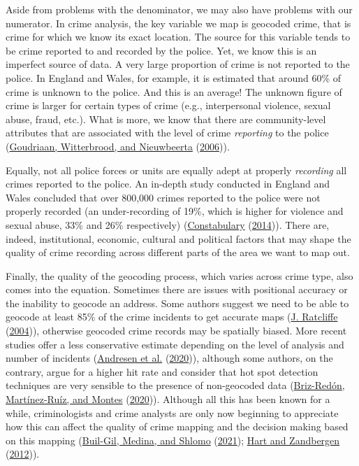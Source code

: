 \documentclass[
]{book}
\begin{document}
Aside from problems with the denominator, we may also have problems with our numerator. In crime analysis, the key variable we map is geocoded crime, that is crime for which we know its exact location. The source for this variable tends to be crime reported to and recorded by the police. Yet, we know this is an imperfect source of data. A very large proportion of crime is not reported to the police. In England and Wales, for example, it is estimated that around 60\% of crime is unknown to the police. And this is an average! The unknown figure of crime is larger for certain types of crime (e.g., interpersonal violence, sexual abuse, fraud, etc.). What is more, we know that there are community-level attributes that are associated with the level of crime \emph{reporting} to the police (\protect\hyperlink{ref-Goudriaan_2006}{Goudriaan, Witterbrood, and Nieuwbeerta} (\protect\hyperlink{ref-Goudriaan_2006}{2006})).

Equally, not all police forces or units are equally adept at properly \emph{recording} all crimes reported to the police. An in-depth study conducted in England and Wales concluded that over 800,000 crimes reported to the police were not properly recorded (an under-recording of 19\%, which is higher for violence and sexual abuse, 33\% and 26\% respectively) (\protect\hyperlink{ref-HMIC_2014}{Constabulary} (\protect\hyperlink{ref-HMIC_2014}{2014})). There are, indeed, institutional, economic, cultural and political factors that may shape the quality of crime recording across different parts of the area we want to map out.

Finally, the quality of the geocoding process, which varies across crime type, also comes into the equation. Sometimes there are issues with positional accuracy or the inability to geocode an address. Some authors suggest we need to be able to geocode at least 85\% of the crime incidents to get accurate maps (\protect\hyperlink{ref-Ratcliffe_2004}{J. Ratcliffe} (\protect\hyperlink{ref-Ratcliffe_2004}{2004})), otherwise geocoded crime records may be spatially biased. More recent studies offer a less conservative estimate depending on the level of analysis and number of incidents (\protect\hyperlink{ref-Andresen_2020}{Andresen et al.} (\protect\hyperlink{ref-Andresen_2020}{2020})), although some authors, on the contrary, argue for a higher hit rate and consider that hot spot detection techniques are very sensible to the presence of non-geocoded data (\protect\hyperlink{ref-Briz-Reduxf3n_2020}{Briz-Redón, Martínez-Ruíz, and Montes} (\protect\hyperlink{ref-Briz-Reduxf3n_2020}{2020})). Although all this has been known for a while, criminologists and crime analysts are only now beginning to appreciate how this can affect the quality of crime mapping and the decision making based on this mapping (\protect\hyperlink{ref-Buil-Gil_2021}{Buil-Gil, Medina, and Shlomo} (\protect\hyperlink{ref-Buil-Gil_2021}{2021}); \protect\hyperlink{ref-Hart_2012}{Hart and Zandbergen} (\protect\hyperlink{ref-Hart_2012}{2012})).
\end{document}
